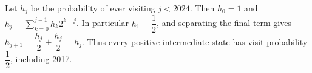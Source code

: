 Let $h_j$ be the probability of ever visiting $j<2024$. Then $h_0=1$ and $h_j=\sum_{k=0}^{j-1}h_k2^{k-j}$. In particular $h_1=\dfrac{1}{2}$, and separating the final term gives $h_{j+1}=\dfrac{h_j}{2}+\dfrac{h_j}{2}=h_j$. Thus every positive intermediate state has visit probability $\boxed{\dfrac{1}{2}}$, including 2017.
